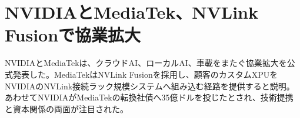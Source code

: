 \section{NVIDIAとMediaTek、NVLink Fusionで協業拡大}
NVIDIAとMediaTekは、クラウドAI、ローカルAI、車載をまたぐ協業拡大を公式発表した。MediaTekはNVLink Fusionを採用し、顧客のカスタムXPUをNVIDIAのNVLink接続ラック規模システムへ組み込む経路を提供すると説明。あわせてNVIDIAがMediaTekの転換社債へ35億ドルを投じたとされ、技術提携と資本関係の両面が注目された。

